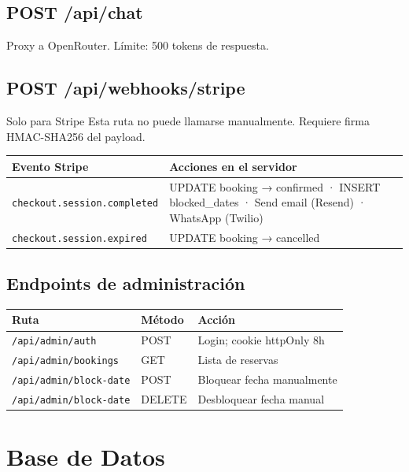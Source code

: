 \documentclass[12pt,a4paper,twoside,openright]{report}
\begin{document}
\section{POST /api/chat}

Proxy a OpenRouter. Límite: 500 tokens de respuesta.

\section{POST /api/webhooks/stripe}

\begin{warnbox}{Solo para Stripe}
Esta ruta no puede llamarse manualmente. Requiere firma HMAC-SHA256 del payload.
\end{warnbox}

\begin{longtable}{L{6cm} L{7cm}}
  \toprule
  \textbf{Evento Stripe} & \textbf{Acciones en el servidor} \\
  \midrule
  \texttt{checkout.session.completed} &
    UPDATE booking → confirmed · INSERT blocked\_dates · Send email (Resend) · WhatsApp (Twilio) \\
  \addlinespace
  \texttt{checkout.session.expired} &
    UPDATE booking → cancelled \\
  \bottomrule
\end{longtable}

\section{Endpoints de administración}

\begin{longtable}{L{5.5cm} C{1.5cm} L{5.5cm}}
  \toprule
  \textbf{Ruta} & \textbf{Método} & \textbf{Acción} \\
  \midrule
  \texttt{/api/admin/auth} & POST & Login; cookie httpOnly 8h \\
  \texttt{/api/admin/bookings} & GET & Lista de reservas \\
  \texttt{/api/admin/block-date} & POST & Bloquear fecha manualmente \\
  \texttt{/api/admin/block-date} & DELETE & Desbloquear fecha manual \\
  \bottomrule
\end{longtable}

\chapter{Base de Datos}
\end{document}
